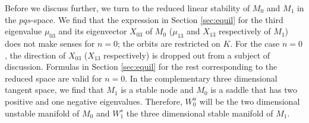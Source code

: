\documentclass[a4paper,11pt]{article}
\theoremstyle{remark}
\begin{document}
Before we discuss further, we turn to the reduced linear stability of $M_0$ and $M_1$ in the $pqs$-space. We find that the expression in Section \ref{sec:equil} for the third eigenvalue $\mu_{03}$ and its eigenvector $X_{03}$ of $M_0$ ($\mu_{13}$ and $X_{13}$ respectively of $M_1$) does not make senses for $n=0$; the orbits are restricted on $K$. %
For the case $n=0$, the direction of $X_{03}$ ($X_{13}$ respectively) is dropped out from a subject of discussion. Formulas in Section \ref{sec:equil} for the rest corresponding to the reduced space are valid for $n=0$. In the complementary three dimensional tangent space, we find that $M_1$ is a stable node and $M_0$ is a saddle that has two positive and one negative eigenvalues. Therefore, $W_0^u$ will be the two dimensional unstable manifold of $M_0$ and $W_1^s$ the three dimensional stable manifold of $M_1$.%
\end{document}
